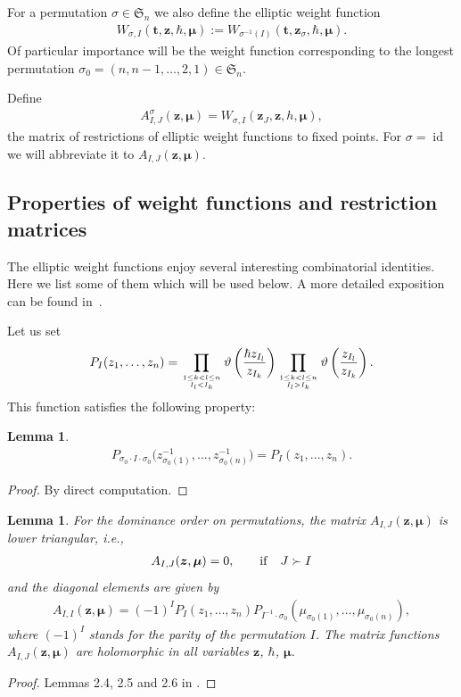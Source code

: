 \documentclass[10pt,a4paper]{amsart}
\DeclareMathOperator\id{id}
\def\ttt{{\boldsymbol t}}
\def\zz{{\boldsymbol z}}
\def\mub{{\boldsymbol\mu}}
\let\thi\vartheta
\numberwithin{equation}{section}
\newtheorem{Lemma}[Theorem]{Lemma}
\begin{document}
For a permutation $\sigma\in \mathfrak{S}_n$ we also define the elliptic weight function
\begin{gather*}
W_{\sigma,I}(\ttt,\zz,\hbar,\mub) :=W_{\sigma^{-1}(I)}(\ttt,\zz_{\sigma},\hbar,\mub).
\end{gather*}
Of particular importance will be the weight function corresponding to the longest permutation $\sigma_0=(n,n-1,\dots,2,1) \in \mathfrak{S}_n$.

Define
\begin{gather} \label{resmat}
A^{\sigma}_{I,J}(\zz,\mub) = W_{\sigma, I} (\zz_{J},\zz,h,\mub),
\end{gather}
the matrix of restrictions of elliptic weight functions to fixed points. For $\sigma=\id$ we will abbreviate it to $A_{I,J}(\zz,\mub)$.

\subsection{Properties of weight functions and restriction matrices}
The elliptic weight functions enjoy several interesting combinatorial identities. Here we list some of them which will be used below. A more detailed exposition can be found in~\cite{Rim,RTV}.

Let us set
\begin{gather*}
P_{I}(z_1,\dots,z_n)=\prod\limits_{{1\leq k <l\leq n}\atop {I_{l}<I_{k}}} \thi\left(\frac{\hbar z_{I_{l}}}{z_{I_{k}}}\right)
\prod\limits_{{1\leq k <l\leq n}\atop {I_{l}>I_{k}}} \thi\left(\frac{ z_{I_{l}}}{z_{I_{k}}}\right).
\end{gather*}
This function satisfies the following property:
\begin{Lemma} \label{pprop}
\begin{gather*}
P_{\sigma_0 \cdot I \cdot \sigma_{0}}\big(z^{-1}_{\sigma_{0}(1)},\dots, z^{-1}_{\sigma_{0}(n)}\big)=P_{I}(z_1,\dots,z_n).
\end{gather*}
\end{Lemma}
\begin{proof}By direct computation.
\end{proof}

\begin{Lemma} \label{hollem}For the dominance order on permutations, the matrix $A_{I,J}(\zz,\mub)$ is lower triangular, i.e.,
\begin{gather*}
A_{I,J}(\zz,\mub)=0, \qquad {\rm if} \quad J \succ I
\end{gather*}
and the diagonal elements are given by
\begin{gather} \label{diagonal}
A_{I,I}(\zz,\mub)=(-1)^{I} P_{I}(z_1,\dots,z_n) P_{I^{-1}\cdot \sigma_{0}} (\mu_{\sigma_{0}(1)},\dots,\mu_{\sigma_{0}(n)}),
\end{gather}
where $(-1)^{I}$ stands for the parity of the permutation $I$. The matrix functions $A_{I,J}(\zz,\mub)$ are holomorphic in all variables $\zz$, $\hbar$, $\mub$.
\end{Lemma}
\begin{proof}Lemmas 2.4, 2.5 and 2.6 in \cite{RTV}.
\end{proof}
\end{document}
